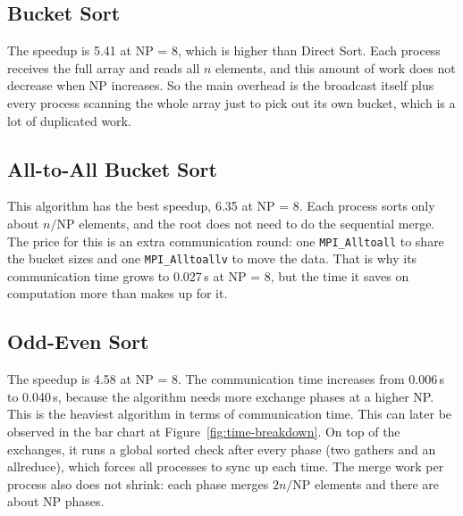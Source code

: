 \subsection{Bucket Sort}

\begin{table}[H]
  \centering
  \small
  
  \caption{Bucket Sort: median of 5 runs for $n = 10^7$.}
  \label{tab:bucket-scaling}
\end{table}

The speedup is 5.41 at NP = 8, which is higher than Direct Sort.
Each process receives the full array and reads all $n$ elements, and this amount of work does not decrease when NP increases.
So the main overhead is the broadcast itself plus every process scanning the whole array just to pick out its own bucket, which is a lot of duplicated work.

\subsection{All-to-All Bucket Sort}

\begin{table}[H]
  \centering
  \small
  
  \caption{All-to-All Bucket Sort: median of 5 runs for $n = 10^7$.}
  \label{tab:all-to-all-scaling}
\end{table}

This algorithm has the best speedup, 6.35 at NP = 8.
Each process sorts only about $n/\mathrm{NP}$ elements, and the root does not need to do the sequential merge.
The price for this is an extra communication round: one \texttt{MPI\_Alltoall} to share the bucket sizes and one \texttt{MPI\_Alltoallv} to move the data.
That is why its communication time grows to 0.027\,s at NP = 8, but the time it saves on computation more than makes up for it.

\subsection{Odd-Even Sort}

\begin{table}[H]
  \centering
  \small
  
  \caption{Odd-Even Sort: median of 5 runs for $n = 10^7$.}
  \label{tab:odd-even-scaling}
\end{table}

The speedup is 4.58 at NP = 8.
The communication time increases from 0.006\,s to 0.040\,s, because the algorithm needs more exchange phases at a higher NP.
This is the heaviest algorithm in terms of communication time. This can later be observed in the bar chart at Figure~\ref{fig:time-breakdown}.
On top of the exchanges, it runs a global sorted check after every phase (two gathers and an allreduce), which forces all processes to sync up each time.
The merge work per process also does not shrink: each phase merges $2n/\mathrm{NP}$ elements and there are about NP phases.

